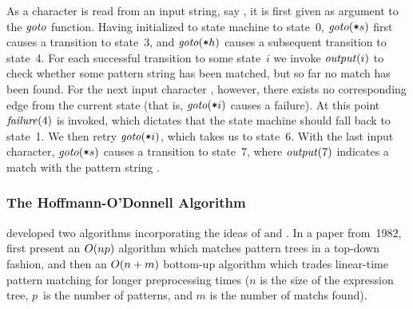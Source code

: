 %
As a character is read from an input string, say , it is first
given as argument to the $\textrm{\textit{goto}}$ function.
%
Having initialized to \gls{state machine} to state~0,
$\textrm{\textit{goto}}(\mbox{\texttt{*}}{s})$ first causes a transition to state~3, and
$\textrm{\textit{goto}}(\mbox{\texttt{*}}{h})$ causes a subsequent transition to state~4.
%
For each successful transition to some state~$i$ we invoke
$\textrm{\textit{output}}(i)$ to check whether some \gls{pattern} string has been
matched, but so far no \gls{match} has been found.
%
For the next input character , however, there exists no corresponding
\gls{edge} from the current state (that is, $\textrm{\textit{goto}}(\mbox{\texttt{*}}{i})$ causes
a failure).
%
At this point $\textrm{\textit{failure}}(4)$ is invoked, which dictates that the
\gls{state machine} should fall back to state~1.
%
We then retry $\textrm{\textit{goto}}(\mbox{\texttt{*}}{i})$, which takes us to state~6.
%
With the last input character, $\textrm{\textit{goto}}(\mbox{\texttt{*}}{s})$ causes a transition
to state~7, where $\textrm{\textit{output}}(7)$ indicates a \gls{match} with the
\gls{pattern} string .


\subsubsection{The Hoffmann-O'Donnell Algorithm}

\textcite{HoffmannODonnell:1982} developed two algorithms incorporating the
ideas of \citeauthor{AhoCorasick:1975} and \citeauthor{KnuthEtAl:1977}.
%
In a paper from~1982, \citeauthor{HoffmannODonnell:1982} first present an
\mbox{$O(np)$} algorithm which matches \glspl{pattern tree} in a top-down
fashion, and then an \mbox{$O(n+m)$} bottom-up algorithm which trades
linear-time \gls{pattern matching} for longer preprocessing times ($n$ is the
size of the \gls{expression tree}, $p$~is the number of \glspl{pattern}, and $m$
is the number of \glspl{match} found).

